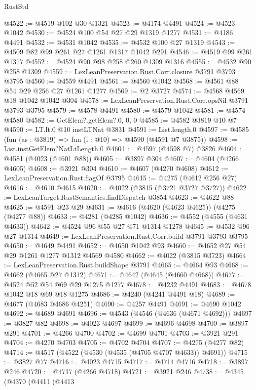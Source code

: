 \begin{lexlean}{RustStd}
\begin{coremodule}
@4522 := @4519 @102 @30 @1321
@4523 := @4174 @4491
@4524 := @4523 @1042
@4530 := @4524 @100 @54 @27 @29 @1319 @1277
@4531 := @4186 @4491
@4532 := @4531 @1042
@4535 := @4532 @100 @27 @1319
@4543 := @4509 @82 @99 @261 @27 @1261 @1317 @1042 @291
@4546 := @4519 @99 @261 @1317
@4552 := @4524 @90 @98 @258 @260 @1309 @1316
@4555 := @4532 @90 @258 @1309
@4559 := LexLeanPreservation.Rust.Corr.closure @3791 @3793 @3795
@4560 := @4559 @4491
@4561 := @4560 @1042
@4568 := @4561 @88 @54 @29 @256 @27 @1261 @1277
@4569 := @2 @3727
@4574 := @4568 @4569 @18 @1042 @1042 @304
@4578 := LexLeanPreservation.Rust.Corr.opsNil @3791 @3793 @3795
@4579 := @4578 @4491
@4580 := @4579 @1042
@4581 := @4574 @4580
@4582 := GetElem?.getElem?.{0, 0, 0}
@4585 := @4582 @3819 @10 @7
@4590 := LT.lt.{0} @10 instLTNat @3831
@4591 := List.length.{0}
@4597 := @4585 (fun (as : @3819) => fun (i : @10) => @4590 (@4591 @7 @3875))
@4598 := List.instGetElem?NatLtLength.{0}
@4601 := @4597 (@4598 @7) @3826
@4604 := @4581 (@4023 (@4601 @88))
@4605 := @3897 @304
@4607 := @4604 (@4266 @4605)
@4608 := @3921 @304
@4610 := @4607 (@4270 @4608)
@4612 := LexLeanPreservation.Rust.flagOf @3795
@4615 := @4275 (@4612 @256 @27)
@4616 := @4610 @4615
@4620 := @4022 (@3815 (@3721 @3727 @3727))
@4622 := LexLeanTarget.RustSemantics.findDispatch @3854
@4623 := @4622 @88
@4625 := @4591 @23 @29
@4631 := @4616 (@4620 (@4623 @4625)) (@4275 (@4277 @88))
@4633 := @4281 (@4285 @1042)
@4636 := @4552 (@4555 (@4631 @4633))
@4642 := @4524 @96 @55 @27 @71 @1314 @1278
@4645 := @4532 @96 @27 @1314
@4649 := LexLeanPreservation.Rust.Corr.build @3791 @3793 @3795
@4650 := @4649 @4491
@4652 := @4650 @1042 @93
@4660 := @4652 @27 @54 @29 @1261 @1277 @1312 @4569 @4580
@4662 := @4022 (@3815 @3723)
@4664 := LexLeanPreservation.Rust.buildShape @3791
@4665 := @4664 @93
@4668 := @4662 (@4665 @27 @1312)
@4671 := @4642 (@4645 (@4660 @4668))
@4677 := @4524 @52 @54 @69 @29 @1275 @1277
@4678 := @4232 @4491
@4683 := @4678 @1042 @18 @69 @18 @1275
@4686 := @4240 (@4241 @4491 @18)
@4689 := @4677 (@4683 @4686 @4251)
@4690 := @4257 @4491
@4691 := @4690 @1042
@4692 := @4689 @4691
@4696 := @4543 (@4546 (@4636 (@4671 @4692)))
@4697 := @3827 @82
@4698 := @4023 @4697
@4699 := @4696 @4698
@4700 := @3897 @291
@4701 := @4266 @4700
@4702 := @4699 @4701
@4703 := @3921 @291
@4704 := @4270 @4703
@4705 := @4702 @4704
@4707 := @4275 (@4277 @82)
@4714 := @4517 (@4522 (@4530 (@4535 (@4705 @4707 @4633)) @4691))
@4715 := @3827 @77
@4716 := @4023 @4715
@4717 := @4714 @4716
@4718 := @3897 @246
@4720 := @4717 (@4266 @4718)
@4721 := @3921 @246
@4738 := @4345
    (@4370
      (@4411
        (@4413

\end{coremodule}
\end{lexlean}
